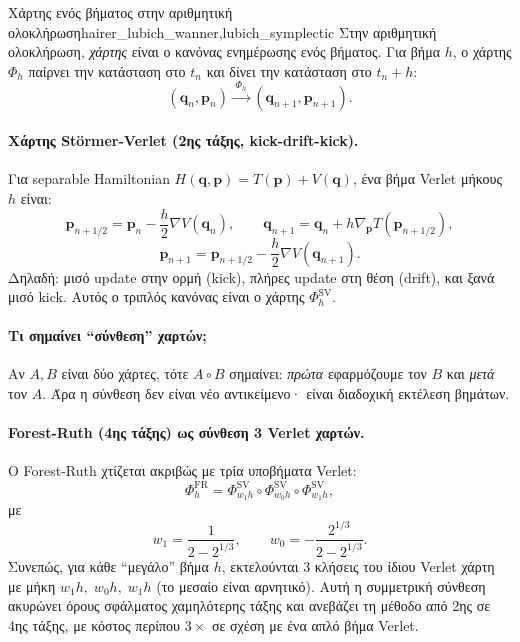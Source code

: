 \documentclass[11pt,a4paper]{report}
\begin{document}
\begin{definitionbox}{Χάρτης ενός βήματος στην αριθμητική ολοκλήρωση}{hairer_lubich_wanner,lubich_symplectic}
Στην αριθμητική ολοκλήρωση, \emph{χάρτης} είναι ο κανόνας ενημέρωσης ενός βήματος.
Για βήμα $h$, ο χάρτης $\Phi_h$ παίρνει την κατάσταση στο $t_n$ και δίνει
την κατάσταση στο $t_n+h$:
\begin{equation}
(\mathbf{q}_n,\mathbf{p}_n)\xrightarrow{\;\Phi_h\;}(\mathbf{q}_{n+1},\mathbf{p}_{n+1}).
\end{equation}
\end{definitionbox}

\paragraph{Χάρτης St\"ormer-Verlet (2ης τάξης, kick-drift-kick).}
Για separable Hamiltonian $H(\mathbf{q},\mathbf{p})=T(\mathbf{p})+V(\mathbf{q})$,
ένα βήμα Verlet μήκους $h$ είναι:
\begin{equation}
\mathbf{p}_{n+1/2}=\mathbf{p}_n-\frac{h}{2}\nabla V(\mathbf{q}_n),
\qquad
\mathbf{q}_{n+1}=\mathbf{q}_n+h\nabla_{\mathbf{p}}T(\mathbf{p}_{n+1/2}),
\end{equation}
\begin{equation}
\mathbf{p}_{n+1}=\mathbf{p}_{n+1/2}-\frac{h}{2}\nabla V(\mathbf{q}_{n+1}).
\end{equation}
Δηλαδή: μισό update στην ορμή (kick), πλήρες update στη θέση (drift), και ξανά μισό kick.
Αυτός ο τριπλός κανόνας είναι ο χάρτης $\Phi_h^{\mathrm{SV}}$.

\paragraph{Τι σημαίνει ``σύνθεση'' χαρτών;}
Αν $A,B$ είναι δύο χάρτες, τότε $A\circ B$ σημαίνει:
\emph{πρώτα} εφαρμόζουμε τον $B$ και \emph{μετά} τον $A$.
Άρα η σύνθεση δεν είναι νέο αντικείμενο· είναι διαδοχική εκτέλεση βημάτων.

\paragraph{Forest-Ruth (4ης τάξης) ως σύνθεση 3 Verlet χαρτών.}
Ο Forest-Ruth χτίζεται ακριβώς με τρία υποβήματα Verlet:
\begin{equation}
\Phi_h^{\mathrm{FR}}=
\Phi_{w_1 h}^{\mathrm{SV}}\circ
\Phi_{w_0 h}^{\mathrm{SV}}\circ
\Phi_{w_1 h}^{\mathrm{SV}},
\end{equation}
με
\begin{equation}
w_1=\frac{1}{2-2^{1/3}},
\qquad
w_0=-\frac{2^{1/3}}{2-2^{1/3}}.
\end{equation}
Συνεπώς, για κάθε ``μεγάλο'' βήμα $h$, εκτελούνται 3 κλήσεις του ίδιου
Verlet χάρτη με μήκη $w_1h,\;w_0h,\;w_1h$ (το μεσαίο είναι αρνητικό).
Αυτή η συμμετρική σύνθεση ακυρώνει όρους σφάλματος χαμηλότερης τάξης και
ανεβάζει τη μέθοδο από 2ης σε 4ης τάξης, με κόστος περίπου $3\times$
σε σχέση με ένα απλό βήμα Verlet.
\end{document}
